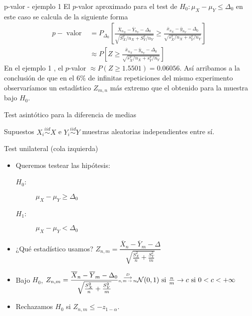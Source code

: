 \documentclass{beamer}
\theoremstyle{definition}
\newcommand\scalemath[2]{\scalebox{#1}{\mbox{\ensuremath{\displaystyle #2}}}}
\begin{document}
\begin{frame}{\color{rosee} p-valor - ejemplo 1}
    El $p$-valor aproximado para el test de $H_0: \mu_X-\mu_Y \leq \Delta_0$ en este caso se calcula de la siguiente forma
$$
\begin{aligned}
p-\text { valor } &=P_{\Delta_0}\left[\frac{\overline{X}_{n_X}-\overline{Y}_{n_Y}-\Delta_0}{\sqrt{S_X^2 / n_X+S_Y^2 / n_Y}} \geq \frac{\overline{x}_{n_X}-\overline{y}_{n_Y}-\Delta_0}{\sqrt{s_X^2 / n_X+s_Y^2 / n_Y}}\right] \\
& \approx P\left[Z \geq \frac{\overline{x}_{n_X}-\overline{y}_{n_Y}-\Delta_0}{\sqrt{s_X^2 / n_X+s_Y^2 / n_Y}}\right]
\end{aligned}
$$
En el ejemplo 1 , el $p$-valor $\approx P(Z \geq 1.5501)=0.06056$. Así arribamos a la conclusión de que en el $6 \%$ de infinitas repeticiones del mismo experimento observaríamos un estadístico $Z_{m,n}$ m\'as extremo que el obtenido para la muestra bajo $H_0$.
\end{frame}

\begin{frame}{\color{rosee} Test asint\'otico para la diferencia de medias} \small

 \begin{block}{Supuestos}
  $X_i \stackrel{iid}{\sim} X$ e $Y_i \stackrel{iid}{\sim} Y$ muestras aleatorias independientes entre s\'i.
 \end{block}
 \begin{block}{Test unilateral (cola izquierda)}
   \begin{itemize}
   \item Queremos testear las hip\'otesis:
     \begin{description}
     \item[$H_0$:] $\mu_X -  \mu_Y \geq \Delta_0$
     \item[$H_1$:] $\mu_X - \mu_Y < \Delta_0$
     \end{description}
   \item ¿Qu\'e estad\'istico usamos? $Z_{n,m} =
       \dfrac{\overline{X}_{n}-\overline{Y}_{m} - \Delta}{\sqrt{\frac{S_X^{2}}{n}
           + \frac{S_Y^2}{m}}}$
   \item Bajo $H_0$, $Z_{n,m}=\dfrac{\overline{X}_{n}-\overline{Y}_{m} - \Delta_0}{\sqrt{\frac{S_X^{2}}{n}
           + \frac{S_Y^2}{m}}} \overset{\stackrel{D}{\longrightarrow}}{\scalemath{0.6}{n,m\to\infty}} \mathcal{N}(0,1) \text{ si } \frac{n}{m}\to c \text{ si } 0<c<+\infty$ %
   \item Rechazamos $H_0$ si $Z_{n,m} \leq -z_{1-\alpha}$.
   \end{itemize}
 \end{block}
\end{frame}
\end{document}
